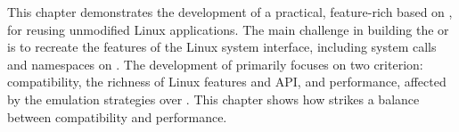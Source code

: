 This chapter
demonstrates the development of a practical, feature-rich \libos{} based on
\thehostabi{},
for reusing unmodified Linux applications.
The main challenge in building the \libos{}
or \thelibos{}
is to recreate the features of the Linux system interface, including
system calls and namespaces on \thehostabi{}. %
The development of \thelibos{}
primarily focuses on two criterion:
compatibility, the richness of Linux features and API,
and performance, affected by
the emulation strategies over \thehostabi{}.
This chapter shows how \thelibos{} strikes a balance between compatibility and performance.




